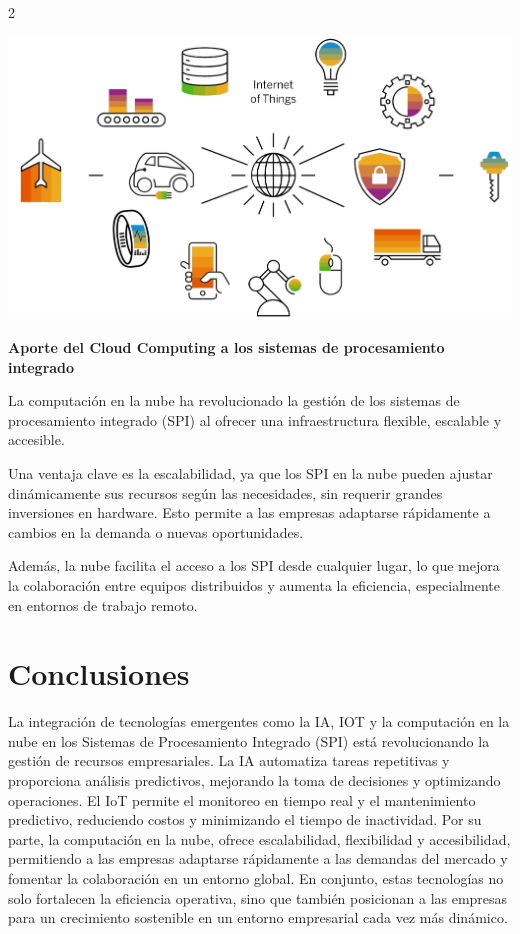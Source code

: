 \documentclass[12pt,spanish,Letterpaper,openany]{book}
\begin{document}
\begin {multicols}{2}
\begin {flushleft}
\begin{minipage}[c]{\columnwidth}
\begin{center}\includegraphics[width=1\linewidth]{imagenes_articulos/sp47_02} \end{center}

\end{minipage}
\end {flushleft}

\textbf{Aporte del Cloud Computing a los sistemas de procesamiento integrado}

La computación en la nube ha revolucionado la gestión de los sistemas de procesamiento integrado (SPI) al ofrecer una infraestructura flexible, escalable y accesible.

Una ventaja clave es la escalabilidad, ya que los SPI en la nube pueden ajustar dinámicamente sus recursos según las necesidades, sin requerir grandes inversiones en hardware. Esto permite a las empresas adaptarse rápidamente a cambios en la demanda o nuevas oportunidades.

Además, la nube facilita el acceso a los SPI desde cualquier lugar, lo que mejora la colaboración entre equipos distribuidos y aumenta la eficiencia, especialmente en entornos de trabajo remoto.

\bigskip
\bigskip
\bigskip

\hypertarget{conclusiones-5}{%
\section{Conclusiones}\label{conclusiones-5}}

La integración de tecnologías emergentes como la IA, IOT y la computación en la nube en los Sistemas de Procesamiento Integrado (SPI) está revolucionando la gestión de recursos empresariales. La IA automatiza tareas repetitivas y proporciona análisis predictivos, mejorando la toma de decisiones y optimizando operaciones. El IoT permite el monitoreo en tiempo real y el mantenimiento predictivo, reduciendo costos y minimizando el tiempo de inactividad. Por su parte, la computación en la nube, ofrece escalabilidad, flexibilidad y accesibilidad, permitiendo a las empresas adaptarse rápidamente a las demandas del mercado y fomentar la colaboración en un entorno global. En conjunto, estas tecnologías no solo fortalecen la eficiencia operativa, sino que también posicionan a las empresas para un crecimiento sostenible en un entorno empresarial cada vez más dinámico.


\end{multicols}
\end{document}
